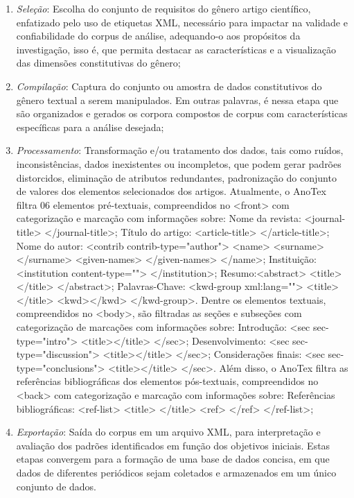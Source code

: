 \documentclass[portuguese]{textolivre}
\begin{document}
\begin{enumerate}
    \item \textit{Seleção}: Escolha do conjunto de requisitos do gênero artigo científico, enfatizado pelo uso de etiquetas XML, necessário para impactar na validade e confiabilidade do corpus de análise, adequando-o aos propósitos da investigação, isso é, que permita destacar as características e a visualização das dimensões constitutivas do gênero;
    \item \textit{Compilação}: Captura do conjunto ou amostra de dados constitutivos do gênero textual a serem manipulados. Em outras palavras, é nessa etapa que são organizados e gerados os corpora compostos de corpus com características específicas para a análise desejada;
    \item \textit{Processamento}: Transformação e/ou tratamento dos dados, tais como ruídos, inconsistências, dados inexistentes ou incompletos, que podem gerar padrões distorcidos, eliminação de atributos redundantes, padronização do conjunto de valores dos elementos selecionados dos artigos.
    Atualmente, o AnoTex filtra 06 elementos pré-textuais, compreendidos no <front> com categorização e marcação com informações sobre: Nome da revista: <journal-title> </journal-title>; Título do artigo: <article-title> </article-title>; Nome do autor: <contrib contrib-type="author"> <name> <surname> </surname> <given-names> </given-names> </name>; Instituição: <institution content-type=""> </institution>; Resumo:<abstract> <title></title> </abstract>; Palavras-Chave: <kwd-group xml:lang=""> <title> </title> <kwd></kwd> </kwd-group>.
Dentre os elementos textuais, compreendidos no <body>, são filtradas as seções e subseções com categorização de marcações com informações sobre: Introdução: <sec sec-type="intro"> <title></title> </sec>; Desenvolvimento: <sec sec-type="discussion"> <title></title> </sec>; Considerações finais: <sec sec-type="conclusions"> <title></title> </sec>.
Além disso, o AnoTex filtra as referências bibliográficas dos elementos pós-textuais, compreendidos no <back> com categorização e marcação com informações sobre: Referências bibliográficas: <ref-list> <title> </title> <ref> </ref> </ref-list>;
    \item \textit{Exportação}: Saída do corpus em um arquivo XML, para interpretação e avaliação dos padrões identificados em função dos objetivos iniciais. Estas etapas convergem para a formação de uma base de dados concisa, em que dados de diferentes periódicos sejam coletados e armazenados em um único conjunto de dados.
\end{enumerate}
\end{document}
